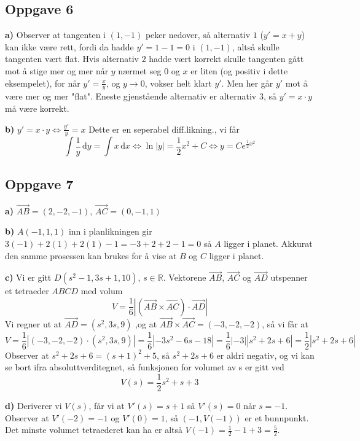 \subsection{Oppgave 6}
\textbf{a)} Observer at tangenten i $(1,-1)$ peker nedover, så alternativ $1$ ($y'=x+y$) kan ikke være rett, fordi da hadde $y'=1-1=0$ i $(1,-1)$, altså skulle tangenten vært flat. Hvis alternativ $2$ hadde vært korrekt skulle tangenten gått mot å stige mer og mer når $y$ nærmet seg $0$ og $x$ er liten (og positiv i dette eksempelet), for når $y'=\frac{x}{y}$, og $y\to 0$, vokser helt klart $y'$. Men her går $y'$ mot å være mer og mer "flat". Eneste gjenstående alternativ er alternativ 3, så $y'=x\cdot y$ må være korrekt. \newline

\textbf{b)} $y'=x\cdot y \Longleftrightarrow \frac{y'}{y} = x$ Dette er en seperabel diff.likning., vi får $$\int \frac{1}{y} \, \text{d}y = \int x \, \text{d}x \Longleftrightarrow \ln|y| = \frac{1}{2}x^2 + C \Longleftrightarrow y = Ce^{\frac12 x^2}$$

\subsection{Oppgave 7}
\textbf{a)} $\overrightarrow{AB} = (2,-2,-1)$, $\overrightarrow{AC}=(0,-1,1)$ \newline

\textbf{b)} $A(-1,1,1)$ inn i planlikningen gir $3(-1) + 2(1) + 2(1) - 1=-3+2+2-1=0$ så $A$ ligger i planet. Akkurat den samme prosessen kan brukes for å vise at $B$ og $C$ ligger i planet. \newline

\textbf{c)} Vi er gitt $D(s^2-1,3s+1,10)$, $s \in \mathbb{R}$. Vektorene $\overrightarrow{AB}$, $\overrightarrow{AC}$ og $\overrightarrow{AD}$ utspenner et tetraeder $ABCD$ med volum $$V=\frac16 \left | (\overrightarrow{AB} \times \overrightarrow{AC}) \cdot \overrightarrow{AD}\right |$$ Vi regner ut at $\overrightarrow{AD}=(s^2,3s,9)$ ,og at $\overrightarrow{AB} \times \overrightarrow{AC} = (-3,-2,-2)$, så vi får at $$V=\frac16 \left| (-3,-2,-2) \cdot (s^2,3s,9) \right|=\frac{1}{6}\left|-3s^2-6s-18 \right|=\frac{1}{6}|-3||s^2+2s+6|=\frac12 |s^2+2s+6|$$ Observer at $s^2+2s+6=(s+1)^2+5$, så $s^2+2s+6$ er aldri negativ, og vi kan se bort ifra absoluttverditegnet, så funksjonen for volumet av s er gitt ved$$V(s)=\frac12s^2+s+3$$

\textbf{d)} Deriverer vi $V(s)$, får vi at $V'(s)=s+1$ så $V'(s)=0$ når $s=-1$. Observer at $V'(-2)=-1$ og $V'(0)=1$, så $(-1,V(-1))$ er et bunnpunkt. Det minste volumet tetraederet kan ha er altså $V(-1)=\frac12 -1 + 3 = \frac52$.

